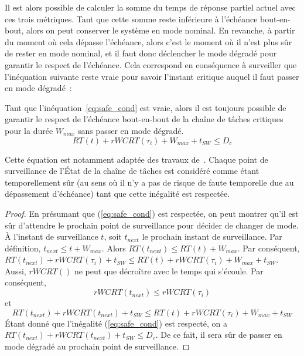 \documentclass[french, a4paper, 11pt, twoside, pdftex]{StyleThese}
\begin{document}
	Il est alors possible de calculer la somme du temps de réponse partiel actuel avec ces trois métriques. Tant que cette somme reste inférieure à l'échéance bout-en-bout, alors on peut conserver le système en mode nominal. En revanche, à partir du moment où cela dépasse l'échéance, alors c'est le moment où il n'est plus sûr de rester en mode nominal, et il faut donc déclencher le mode dégradé pour garantir le respect de l'échéance. Cela correspond en conséquence à surveiller que l'inéquation suivante reste vraie pour savoir l'instant critique auquel il faut passer en mode dégradé~:
	
	\begin{theorem}
		Tant que l'inéquation~\ref{eq:safe_cond} est vraie, alors il est toujours possible de garantir le respect de l'échéance bout-en-bout de la chaîne de tâches critiques pour la durée $W_{max}$ sans passer en mode dégradé.
		\begin{equation} \label{eq:safe_cond}
			RT(t) + rWCRT(\tau_i) + W_{max} + t_{SW} \leq D_c
		\end{equation} 
	\end{theorem}

	Cette équation est notamment adaptée des travaux de~\cite{kritikakou_run-time_2014}. Chaque point de surveillance de l'État de la chaîne de tâches est considéré comme étant temporellement sûr (au sens où il n'y a pas de risque de faute temporelle due au dépassement d'échéance) tant que cette inégalité est respectée.
    
    \begin{proof}
		En présumant que (\ref{eq:safe_cond}) est respectée, on peut montrer qu'il est sûr d'attendre le prochain point de surveillance pour décider de changer de mode. \nline
		À l'instant de surveillance $t$, soit $t_{next}$ le prochain instant de surveillance.\nline
		Par définition, $t_{next} \leq t + W_{max}$. Alors $RT(t_{next}) \leq RT(t) + W_{max}$. 
		Par conséquent, \smallbreak
		$RT(t_{next}) + rWCRT(\tau_i) + t_{SW} \leq RT(t) + rWCRT(\tau_i) + W_{max} + t_{SW}$. \nline
		Aussi, $rWCRT()$ ne peut que décroître avec le temps qui s'écoule. Par conséquent, %
		\[ rWCRT(t_{next}) \leq rWCRT(\tau_i)	\]
		et 
		\[ RT(t_{next}) + rWCRT(t_{next}) + t_{SW} \leq RT(t) + rWCRT(\tau_i) + W_{max} + t_{SW} \] 
		Étant donné que l'inégalité (\ref{eq:safe_cond}) est respecté, on a $RT(t_{next}) + rWCRT(t_{next}) + t_{SW} \leq D_c$.
		De ce fait, il sera sûr de passer en mode dégradé au prochain point de surveillance.  
    \end{proof}
    
\end{document}
